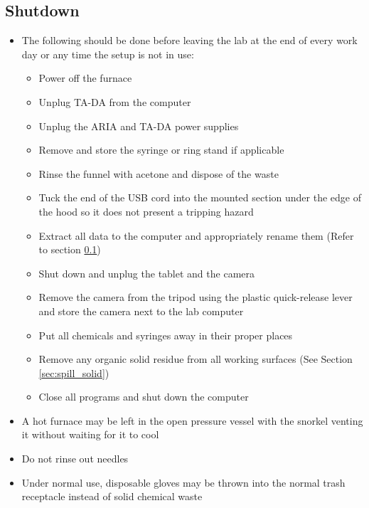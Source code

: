 \documentclass[letterpaper,11pt]{article}
\begin{document}
\subsection{Shutdown}
    \begin{itemize}
    \item The following should be done before leaving the lab at the end of 
        every work day or any time the setup is not in use:
        \begin{itemize}
        \item Power off the furnace
        \item Unplug TA-DA from the computer
        \item Unplug the ARIA and TA-DA power supplies 
        \item Remove and store the syringe or ring stand if applicable
        \item Rinse the funnel with acetone and dispose of the waste
        \item Tuck the end of the USB cord into the mounted section under the 
            edge of the hood so it does not present a tripping hazard
        \item Extract all data to the computer and appropriately rename them 
            (Refer to section \ref{})
        \item Shut down and unplug the tablet and the camera
        \item Remove the camera from the tripod using the plastic quick-release 
            lever and store the camera next to the lab computer
        \item Put all chemicals and syringes away in their proper places
        \item Remove any organic solid residue from all working surfaces 
            (See Section \ref{sec:spill_solid})
        \item Close all programs and shut down the computer
        \end{itemize}
    
    \item A hot furnace may be left in the open pressure vessel with the snorkel 
        venting it without waiting for it to cool
    \item Do not rinse out needles %
    \item Under normal use, disposable gloves may be thrown into the normal 
        trash receptacle instead of solid chemical waste
    \end{itemize}
    
\end{document}
